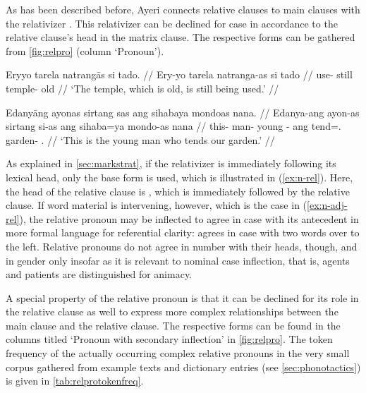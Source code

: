As has been described before, Ayeri connects relative clauses to main clauses 
with the relativizer . This relativizer can be declined for case 
in accordance to the relative clause's head in the matrix clause. The 
respective forms can be gathered from \autoref{fig:relpro} (column 
`Pronoun').

\pex
\a\label{ex:n-rel}\begingl
	\gla Eryyo tarela natrangās si tado. //
	\glb Ery-yo tarela natranga-as si tado //
	\glc use-\TsgN{} still temple-\Parg{} \Rel{} old //
	\glft `The temple, which is old, is still being used.' //
\endgl

\a\label{ex:n-adj-rel}\begingl
	\gla Edanyāng ayonas sirtang sas ang sihabaya mondoas nana. //
	\glb Edanya-ang ayon-as sirtang si-as ang sihaba=ya mondo-as nana //
	\glc this-\Aarg{} man-\Parg{} young \Rel{}-\Parg{} 
		ang tend=\TsgM{}.\Top{} garden-\Parg{} \Fpl{}.\Gen{} //
	\glft `This is the young man who tends our garden.' //
\endgl
\xe

As explained in \autoref{sec:markstrat}, if the relativizer is immediately 
following its lexical head, only the base form  is used, which is 
illustrated in (\ref{ex:n-rel}). Here, the head of the relative clause is 
, which is immediately followed by the 
relative clause. If word material is intervening, however, which is the case in 
(\ref{ex:n-adj-rel}), the relative pronoun may be inflected to agree in case 
with its antecedent in more formal language for referential clarity: 
 agrees in case with  two words over to the 
left. Relative pronouns do not agree in number with their heads, though, and in 
gender only insofar as it is relevant to nominal case inflection, that is, 
agents and patients are distinguished for animacy.

A special property of the relative pronoun is that it can be declined for its 
role in the relative clause as well to express more complex relationships 
between the main clause and the relative clause. The respective forms can be 
found in the columns titled `Pronoun with secondary inflection' in 
\autoref{fig:relpro}. The token frequency of the actually occurring complex 
relative pronouns in the very small corpus gathered from example texts and 
dictionary entries (see \autoref{sec:phonotactics}) is given in 
\autoref{tab:relprotokenfreq}.

